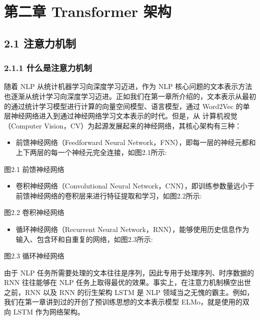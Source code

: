 \documentclass[12pt,a4paper]{book}
\begin{document}
\section{第二章 Transformer
架构}\label{ux7b2cux4e8cux7ae0-transformer-ux67b6ux6784}

\subsection{2.1 注意力机制}\label{ux6ce8ux610fux529bux673aux5236}

\subsubsection{2.1.1
什么是注意力机制}\label{ux4ec0ux4e48ux662fux6ce8ux610fux529bux673aux5236}

随着 NLP 从统计机器学习向深度学习迈进，作为 NLP
核心问题的文本表示方法也逐渐从统计学习向深度学习迈进。正如我们在第一章所介绍的，文本表示从最初的通过统计学习模型进行计算的向量空间模型、语言模型，通过
Word2Vec 的单层神经网络进入到通过神经网络学习文本表示的时代。但是，从
计算机视觉（Computer
Vision，CV）为起源发展起来的神经网络，其核心架构有三种：

\begin{itemize}
\tightlist
\item
  前馈神经网络（Feedforward Neural
  Network，FNN），即每一层的神经元都和上下两层的每一个神经元完全连接，如图2.1所示:
\end{itemize}

图2.1 前馈神经网络

\begin{itemize}
\tightlist
\item
  卷积神经网络（Convolutional Neural
  Network，CNN），即训练参数量远小于前馈神经网络的卷积层来进行特征提取和学习，如图2.2所示:
\end{itemize}

图2.2 卷积神经网络

\begin{itemize}
\tightlist
\item
  循环神经网络（Recurrent Neural
  Network，RNN），能够使用历史信息作为输入、包含环和自重复的网络，如图2.3所示:
\end{itemize}

图2.3 循环神经网络

由于 NLP 任务所需要处理的文本往往是序列，因此专用于处理序列、时序数据的
RNN 往往能够在 NLP
任务上取得最优的效果。事实上，在注意力机制横空出世之前，RNN 以及 RNN
的衍生架构 LSTM 是 NLP
领域当之无愧的霸主。例如，我们在第一章讲到过的开创了预训练思想的文本表示模型
ELMo，就是使用的双向 LSTM 作为网络架构。
\end{document}
